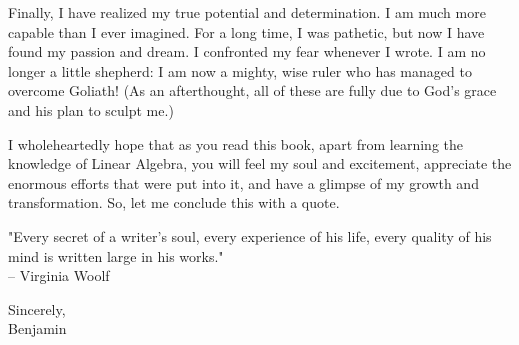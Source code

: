 Finally, I have realized my true potential and determination. I am much more capable than I ever imagined. For a long time, I was pathetic, but now I have found my passion and dream. I confronted my fear whenever I wrote. I am no longer a little shepherd: I am now a mighty, wise ruler who has managed to overcome Goliath! (As an afterthought, all of these are fully due to God's grace and his plan to sculpt me.)

I wholeheartedly hope that as you read this book, apart from learning the knowledge of Linear Algebra, you will feel my soul and excitement, appreciate the enormous efforts that were put into it, and have a glimpse of my growth and transformation. So, let me conclude this with a quote.

\begin{center}
\large
"Every secret of a writer's soul, every experience of his life, every quality of his mind is written large in his works."\\
-- Virginia Woolf
\end{center}

{\raggedleft Sincerely,\\
Benjamin \par}

\tableofcontents